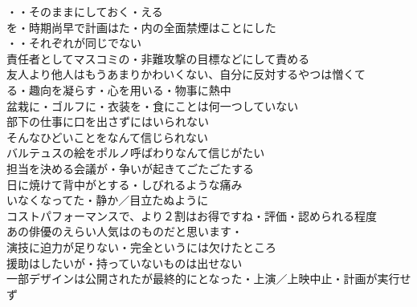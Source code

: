 ・・そのままにしておく・える　　\\
を・時期尚早で計画はた・内の全面禁煙はことにした\\

・・それぞれが同じでない\\
責任者としてマスコミの・非難攻撃の目標などにして責める\\
友人より他人はもうあまりかわいくない、自分に反対するやつは憎くて\\

る・趣向を凝らす・心を用いる・物事に熱中\\
盆栽に・ゴルフに・衣装を・食にことは何一つしていない\\

部下の仕事に口を出さずにはいられない\\
そんなひどいことをなんて信じられない\\
バルテュスの絵をポルノ呼ばわりなんて信じがたい\\

担当を決める会議が・争いが起きてごたごたする\\
日に焼けて背中がとする・しびれるような痛み\\
いなくなってた・静か／目立たぬように\\

コストパフォーマンスで、より２割はお得ですね・評価・認められる程度\\
あの俳優のえらい人気はのものだと思います・\\
演技に迫力が足りない・完全というには欠けたところ\\
援助はしたいが・持っていないものは出せない\\
一部デザインは公開されたが最終的にとなった・上演／上映中止・計画が実行せず\\
